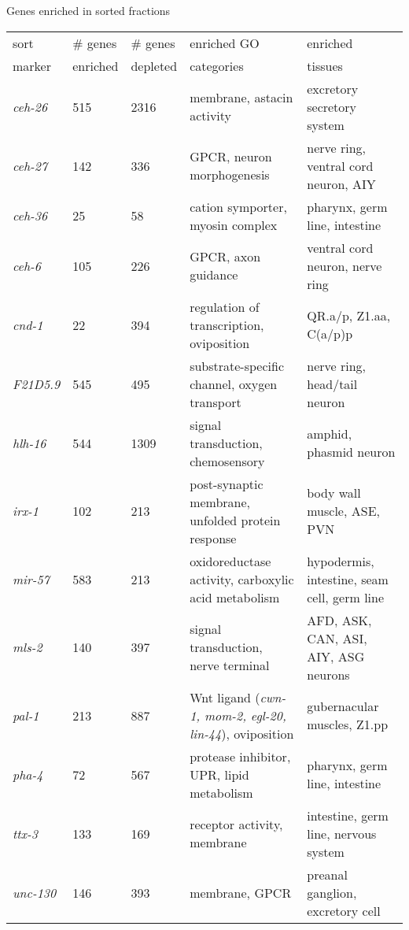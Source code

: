 \documentclass[serif,9pt]{beamer}
\begin{document}
\begin{frame}{Genes enriched in sorted fractions}

\begin{table}\tiny
\begin{tabular}{lll p{1.2in} p{1.2in} }
sort & \# genes & \# genes & enriched GO & enriched \\
marker & enriched & depleted & categories & tissues \\
\hline
{\em ceh-26} & 515 & 2316 & membrane, astacin activity & excretory secretory system \\
{\em ceh-27} & 142 & 336 & GPCR, neuron morphogenesis & nerve ring, ventral cord neuron, AIY \\
{\em ceh-36} & 25 & 58 & cation symporter, myosin complex & pharynx, germ line, intestine \\
{\em ceh-6} & 105 & 226 & GPCR, axon guidance & ventral cord neuron, nerve ring \\
{\em cnd-1} & 22 & 394 & regulation of transcription, oviposition & QR.a/p, Z1.aa, C(a/p)p \\
{\em F21D5.9} & 545 & 495 & substrate-specific channel, oxygen transport & nerve ring, head/tail neuron \\
{\em hlh-16} & 544 & 1309 & signal transduction, chemosensory & amphid, phasmid neuron \\
{\em irx-1} & 102 & 213 & post-synaptic membrane, unfolded protein response & body wall muscle, ASE, PVN \\
{\em mir-57} & 583 & 213 & oxidoreductase activity, carboxylic acid metabolism & hypodermis, intestine, seam cell, germ line \\
{\em mls-2} & 140 & 397 & signal transduction, nerve terminal & AFD, ASK, CAN, ASI, AIY, ASG neurons \\
{\em pal-1} & 213 & 887 & Wnt ligand ({\em cwn-1, mom-2, egl-20, lin-44}), oviposition & gubernacular muscles, Z1.pp      \\
{\em pha-4} & 72 & 567 & protease inhibitor, UPR, lipid metabolism & pharynx, germ line, intestine \\
{\em ttx-3} & 133 & 169 & receptor activity, membrane & intestine, germ line, nervous system \\
{\em unc-130} & 146 & 393 & membrane, GPCR & preanal ganglion, excretory cell \\
\end{tabular}
\end{table}

\end{frame}
\end{document}
